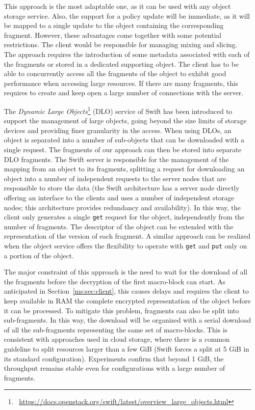 \medskip
{} This approach is the most adaptable one, as it can be used with any object storage service. Also, the support for a policy update will be immediate, as it will be mapped to a single update to the object containing the corresponding fragment. However, these advantages come together with some potential restrictions. The client would be responsible for managing mixing and slicing. The approach requires the introduction of some metadata associated with each of the fragments or stored in a dedicated supporting object. The client has to be able to concurrently access all the fragments of the object to exhibit good performance when accessing large resources. If there are many fragments, this requires to create and keep open a large number of connections with the server.

\medskip
{}  
The {\em Dynamic Large Objects}\footnote{\ \tiny{\url{https://docs.openstack.org/swift/latest/overview_large_objects.html}}} (DLO) service of Swift has been introduced to support the management of large objects, going beyond the size limits of storage devices and providing finer granularity in the access. When using DLOs, an object is separated into a number of sub-objects that can be downloaded with a single request. The fragments of our approach can then be stored into separate DLO fragments. The Swift server is responsible for the management of the mapping from an object to its fragments, splitting a request for downloading an object into a number of independent requests to the server nodes that are responsible to store the data (the Swift architecture has a server node directly offering an interface to the clients and uses a number of independent storage nodes; this architecture provides redundancy and availability). In this way, the client only generates a single {\tt get} request for the object, independently from the number of fragments. The descriptor of the object can be extended with the representation of the version of each fragment. A similar approach can be realized when the object service offers the flexibility to operate with {\tt get} and {\tt put} only on a portion of the object.

The major constraint of this approach is the need to wait for the download of all the fragments before the decryption of the first macro-block can start. As anticipated in Section~\ref{ms:sec:client}, this causes delays and requires the client to keep available in RAM the complete encrypted representation of the object before it can be processed. To mitigate this problem, fragments can also be split into sub-fragments. In this way, the download will be organized with a serial download of all the sub-fragments representing the same set of macro-blocks. This is consistent with approaches used in cloud storage, where there is a common guideline to split resources larger than a few GiB (Swift forces a split at 5 GiB in its standard configuration). Experiments confirm that beyond 1 GiB, the throughput remains stable even for configurations with a large number of fragments.


